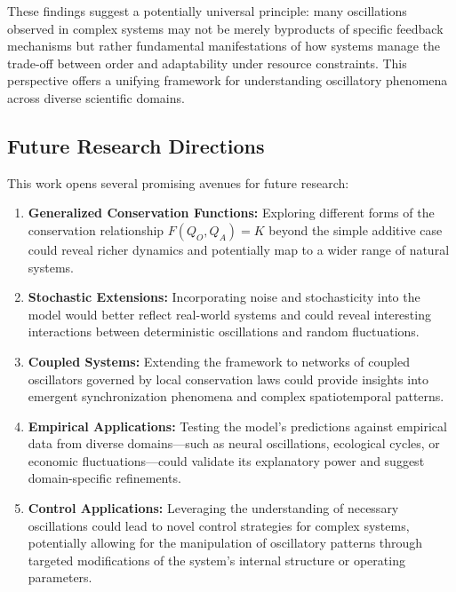 \documentclass[11pt,a4paper]{article}
\begin{document}
These findings suggest a potentially universal principle: many oscillations observed in complex systems may not be merely byproducts of specific feedback mechanisms but rather fundamental manifestations of how systems manage the trade-off between order and adaptability under resource constraints. This perspective offers a unifying framework for understanding oscillatory phenomena across diverse scientific domains.

\subsection{Future Research Directions}

This work opens several promising avenues for future research:

\begin{enumerate}
    \item \textbf{Generalized Conservation Functions:} Exploring different forms of the conservation relationship $F(Q_O, Q_A)=K$ beyond the simple additive case could reveal richer dynamics and potentially map to a wider range of natural systems.

    \item \textbf{Stochastic Extensions:} Incorporating noise and stochasticity into the model would better reflect real-world systems and could reveal interesting interactions between deterministic oscillations and random fluctuations.

    \item \textbf{Coupled Systems:} Extending the framework to networks of coupled oscillators governed by local conservation laws could provide insights into emergent synchronization phenomena and complex spatiotemporal patterns.

    \item \textbf{Empirical Applications:} Testing the model's predictions against empirical data from diverse domains—such as neural oscillations, ecological cycles, or economic fluctuations—could validate its explanatory power and suggest domain-specific refinements.

    \item \textbf{Control Applications:} Leveraging the understanding of necessary oscillations could lead to novel control strategies for complex systems, potentially allowing for the manipulation of oscillatory patterns through targeted modifications of the system's internal structure or operating parameters.
\end{enumerate}
\end{document}

